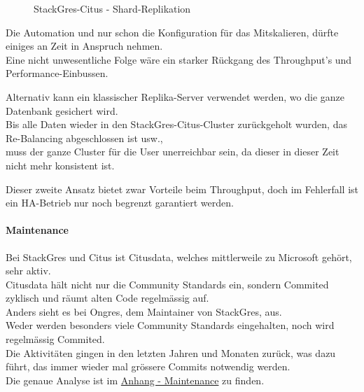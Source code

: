 \begin{flushleft}
\begin{flushleft}
\begin{flushleft}
\begin{figure}[H]
                \caption{StackGres-Citus - Shard-Replikation}
                \label{fig:stackgres_shard_replication}
            \end{figure}
            Die Automation und nur schon die Konfiguration für das Mitskalieren, dürfte einiges an Zeit in Anspruch nehmen.\\
            Eine nicht unwesentliche Folge wäre ein starker Rückgang des Throughput's und Performance-Einbussen.
        \end{flushleft}
        \begin{flushleft}
            Alternativ kann ein klassischer Replika-Server verwendet werden, wo die ganze Datenbank gesichert wird.\\
            Bis alle Daten wieder in den StackGres-Citus-Cluster zurückgeholt wurden, das Re-Balancing abgeschlossen ist usw.,\\
            muss der ganze Cluster für die User unerreichbar sein, da dieser in dieser Zeit nicht mehr konsistent ist.
        \end{flushleft}
        \begin{flushleft}
            Dieser zweite Ansatz bietet zwar Vorteile beim Throughput, doch im Fehlerfall ist ein HA-Betrieb nur noch begrenzt garantiert werden.
        \end{flushleft}
    \end{flushleft}
\end{flushleft}
\begin{flushleft}
    \paragraph{Maintenance}
    Bei StackGres und Citus ist Citusdata, welches mittlerweile zu Microsoft gehört, sehr aktiv.\\
    Citusdata hält nicht nur die Community Standards ein, sondern Commited zyklisch und räumt alten Code regelmässig auf.\\
    Anders sieht es bei Ongres, dem Maintainer von StackGres, aus.\\
    Weder werden besonders viele Community Standards eingehalten, noch wird regelmässig Commited.\\
    Die Aktivitäten gingen in den letzten Jahren und Monaten zurück, was dazu führt, das immer wieder mal grössere Commits notwendig werden.\\
    Die genaue Analyse ist im \hyperref[subsec:maintenance_stackgres_citus]{Anhang - Maintenance} zu finden.
\end{flushleft}